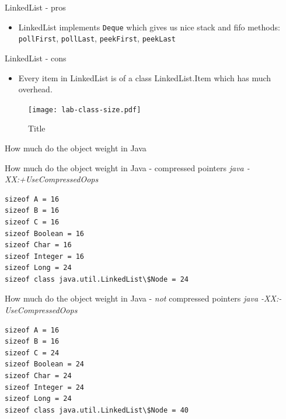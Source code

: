 \documentclass{beamer}
\begin{document}
\begin{frame}{LinkedList - pros}

\begin{itemize}
\item LinkedList implements \texttt{Deque} which gives us nice stack and fifo methods:
 \texttt{pollFirst}, \texttt{pollLast}, \texttt{peekFirst}, \texttt{peekLast}
\end{itemize}

\end{frame}

\begin{frame}{LinkedList - cons}

\begin{itemize}
\item Every item in LinkedList is of a class LinkedList.Item which has much overhead.
\end{itemize}
    \begin{figure}[htbp]
    \centering
        \texttt{[image: lab-class-size.pdf]}
    \caption{Title}
    \label{fig:lab-class-size}
    \end{figure}
\end{frame}

\lstset{style=srcnormal}
\begin{frame}[fragile]{How much do the object weight in Java}
    
\end{frame}

\begin{frame}[fragile]{How much do the object weight in Java - compressed pointers}
\textit{java -XX:+UseCompressedOops}
    \begin{verbatim}
sizeof A = 16
sizeof B = 16
sizeof C = 16
sizeof Boolean = 16
sizeof Char = 16
sizeof Integer = 16
sizeof Long = 24
sizeof class java.util.LinkedList\$Node = 24
    \end{verbatim}
\end{frame}

\begin{frame}[fragile]{How much do the object weight in Java - \textit{not} compressed pointers}
\textit{java -XX:-UseCompressedOops}
\begin{verbatim}
sizeof A = 16
sizeof B = 16
sizeof C = 24
sizeof Boolean = 24
sizeof Char = 24
sizeof Integer = 24
sizeof Long = 24
sizeof class java.util.LinkedList\$Node = 40
\end{verbatim}
\end{frame}
\end{document}
